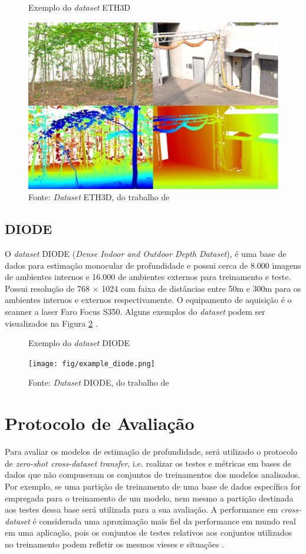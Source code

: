 \begin{figure}[h]
    \centering
    \caption{Exemplo do \textit{dataset} ETH3D}
    \includegraphics[width=.6\textwidth]{fig/eth3d_example.png}
    \caption*{Fonte: \textit{Dataset} ETH3D, do trabalho de }
    \label{fig:eth3dexample}
\end{figure}


\subsection{DIODE}

O \textit{dataset} DIODE (\textit{Dense Indoor and Outdoor Depth Dataset}), é uma base de dados para estimação monocular de profundidade e possui cerca de 8.000 imagens de ambientes internos e 16.000 de ambientes externos para treinamento e teste. Possui resolução de 768 $\times$ 1024 com faixa de distâncias entre 50m e 300m para os ambientes internos e externos respectivamente. O equipamento de aquisição é o scanner a laser Faro Focus S350. Alguns exemplos do \textit{dataset} podem ser visualizados na Figura \ref{exdiode} \cite{diode_dataset}.

\begin{figure}[h]
    \centering
    \caption{Exemplo do \textit{dataset} DIODE}
    \texttt{[image: fig/example\_diode.png]}
    \caption*{Fonte: \textit{Dataset} DIODE, do trabalho de }
    \label{exdiode}
\end{figure}



\section{Protocolo de Avaliação}

Para avaliar os modelos de estimação de profundidade, será utilizado o protocolo de \textit{zero-shot cross-dataset transfer}, i.e. realizar os testes e métricas em bases de dados que não compuseram os conjuntos de treinamentos dos modelos analisados. Por exemplo, se uma partição de treinamento de uma base de dados específica for empregada para o treinamento de um modelo, nem mesmo a partição destinada aos testes dessa base será utilizada para a sua avaliação. A performance em \textit{cross-dataset} é considerada uma aproximação mais fiel da performance em mundo real em uma aplicação, pois os conjuntos de testes relativos aos conjuntos utilizados no treinamento podem refletir os mesmos vieses e situações \cite{ranftl2020towards}.

